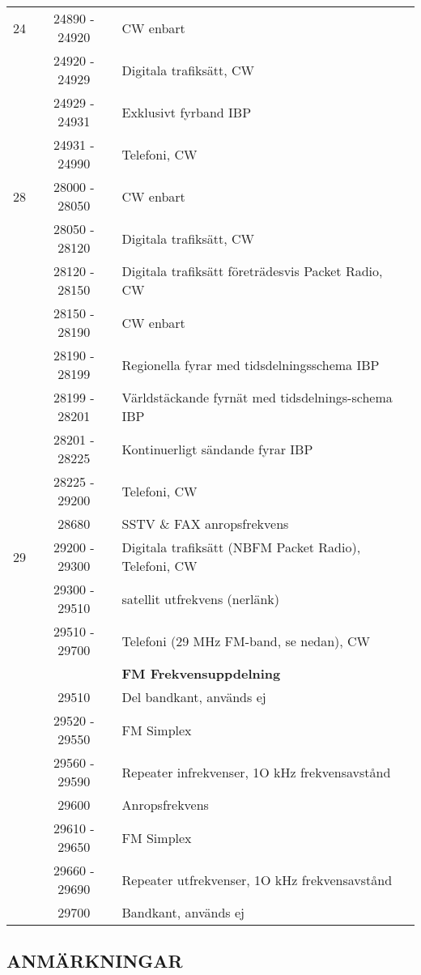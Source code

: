 \begin{longtable}{lcl}
24   & 24890 - 24920 & CW enbart \\
     & 24920 - 24929 & Digitala trafiksätt, CW \\
     & 24929 - 24931 & Exklusivt fyrband IBP \\
     & 24931 - 24990 & Telefoni, CW \\

28   & 28000 - 28050 & CW enbart \\
     & 28050 - 28120 & Digitala trafiksätt, CW \\
     & 28120 - 28150 & Digitala trafiksätt företrädesvis Packet Radio, CW \\
     & 28150 - 28190 & CW enbart \\
     & 28190 - 28199 & Regionella fyrar med tidsdelningsschema IBP \\
     & 28199 - 28201 & Världstäckande fyrnät med tidsdelnings-schema IBP \\
     & 28201 - 28225 & Kontinuerligt sändande fyrar IBP \\
     & 28225 - 29200 & Telefoni, CW \\
     & 28680         & SSTV \& FAX anropsfrekvens \\

29   & 29200 - 29300 & Digitala trafiksätt (NBFM Packet Radio), Telefoni, CW \\
     & 29300 - 29510 & satellit utfrekvens (nerlänk) \\
     & 29510 - 29700 & Telefoni (29 MHz FM-band, se nedan), CW \\
     &               & \textbf{FM Frekvensuppdelning} \\
     & 29510         & Del bandkant, används ej \\
     & 29520 - 29550 & FM Simplex \\
     & 29560 - 29590 & Repeater infrekvenser, 1O kHz frekvensavstånd \\
     & 29600         & Anropsfrekvens \\
     & 29610 - 29650 & FM Simplex \\
     & 29660 - 29690 & Repeater utfrekvenser, 1O kHz frekvensavstånd \\
     & 29700         & Bandkant, används ej \\
\end{longtable}

\subsection{ANMÄRKNINGAR}


